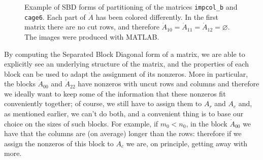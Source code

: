 \begin{figure}[h]
	\caption{Example of SBD forms of partitioning of the matrices \texttt{impcol\_b} and \texttt{cage6}. Each part of $\dot{A}$ has been colored differently. In the first matrix there are no cut rows, and therefore $\dot{A}_{10}=\dot{A}_{11} =\dot{A}_{12} = \varnothing$. The images were produced with MATLAB.} \label{fig:sbd-2}
\end{figure}


By computing the Separated Block Diagonal form of a matrix, we are able to explicitly see an underlying structure of the matrix, and the properties of each block can be used to adapt the assignment of its nonzeros. More in particular, the blocks $\dot{A}_{00}$ and $\dot{A}_{22}$ have nonzeros with uncut rows and columns and therefore we ideally want to keep some of the information that these nonzeros fit conveniently together; of course, we still have to assign them to $A_r$ and $A_c$ and, as mentioned earlier, we can't do both, and a convenient thing is to base our choice on the sizes of such blocks. For example, if $m_0 < n_0$, in the block $\dot{A}_{00}$ we have that the columns are (on average) longer than the rows: therefore if we assign the nonzeros of this block to $A_c$ we are, on principle, getting away with more.

